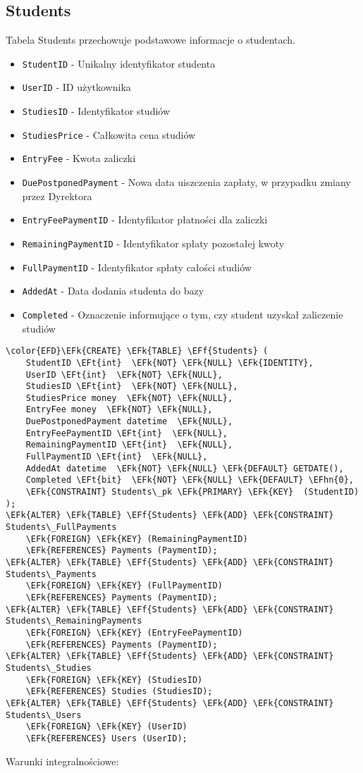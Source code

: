 \documentclass[11pt]{article}
\newcommand{\EFk}[1]{\textcolor{EFk}{\textbf{#1}}} %
\newcommand{\EFf}[1]{\textcolor{EFf}{#1}} %
\newcommand{\EFt}[1]{\textcolor{EFt}{\textbf{#1}}} %
\newcommand{\EFhn}[1]{\textcolor{EFhn}{#1}} %
\begin{document}
\subsection{Students}
\label{sec:org9cfb669}
Tabela Students przechowuje podstawowe informacje o studentach.
\begin{itemize}
\item \texttt{StudentID} - Unikalny identyfikator studenta
\item \texttt{UserID} - ID użytkownika
\item \texttt{StudiesID} - Identyfikator studiów
\item \texttt{StudiesPrice} - Całkowita cena studiów
\item \texttt{EntryFee} - Kwota zaliczki
\item \texttt{DuePostponedPayment} - Nowa data uiszczenia zapłaty, w przypadku zmiany przez Dyrektora
\item \texttt{EntryFeePaymentID} - Identyfikator płatności dla zaliczki
\item \texttt{RemainingPaymentID} - Identyfikator spłaty pozostałej kwoty
\item \texttt{FullPaymentID} - Identyfikator spłaty całości studiów
\item \texttt{AddedAt} - Data dodania studenta do bazy
\item \texttt{Completed} - Oznaczenie informujące o tym, czy student uzyskał zaliczenie studiów
\end{itemize}
\begin{Code}
\begin{Verbatim}
\color{EFD}\EFk{CREATE} \EFk{TABLE} \EFf{Students} (
    StudentID \EFt{int}  \EFk{NOT} \EFk{NULL} \EFk{IDENTITY},
    UserID \EFt{int}  \EFk{NOT} \EFk{NULL},
    StudiesID \EFt{int}  \EFk{NOT} \EFk{NULL},
    StudiesPrice money  \EFk{NOT} \EFk{NULL},
    EntryFee money  \EFk{NOT} \EFk{NULL},
    DuePostponedPayment datetime  \EFk{NULL},
    EntryFeePaymentID \EFt{int}  \EFk{NULL},
    RemainingPaymentID \EFt{int}  \EFk{NULL},
    FullPaymentID \EFt{int}  \EFk{NULL},
    AddedAt datetime  \EFk{NOT} \EFk{NULL} \EFk{DEFAULT} GETDATE(),
    Completed \EFt{bit}  \EFk{NOT} \EFk{NULL} \EFk{DEFAULT} \EFhn{0},
    \EFk{CONSTRAINT} Students\_pk \EFk{PRIMARY} \EFk{KEY}  (StudentID)
);
\EFk{ALTER} \EFk{TABLE} \EFf{Students} \EFk{ADD} \EFk{CONSTRAINT} Students\_FullPayments
    \EFk{FOREIGN} \EFk{KEY} (RemainingPaymentID)
    \EFk{REFERENCES} Payments (PaymentID);
\EFk{ALTER} \EFk{TABLE} \EFf{Students} \EFk{ADD} \EFk{CONSTRAINT} Students\_Payments
    \EFk{FOREIGN} \EFk{KEY} (FullPaymentID)
    \EFk{REFERENCES} Payments (PaymentID);
\EFk{ALTER} \EFk{TABLE} \EFf{Students} \EFk{ADD} \EFk{CONSTRAINT} Students\_RemainingPayments
    \EFk{FOREIGN} \EFk{KEY} (EntryFeePaymentID)
    \EFk{REFERENCES} Payments (PaymentID);
\EFk{ALTER} \EFk{TABLE} \EFf{Students} \EFk{ADD} \EFk{CONSTRAINT} Students\_Studies
    \EFk{FOREIGN} \EFk{KEY} (StudiesID)
    \EFk{REFERENCES} Studies (StudiesID);
\EFk{ALTER} \EFk{TABLE} \EFf{Students} \EFk{ADD} \EFk{CONSTRAINT} Students\_Users
    \EFk{FOREIGN} \EFk{KEY} (UserID)
    \EFk{REFERENCES} Users (UserID);
\end{Verbatim}
\end{Code}
Warunki integralnościowe:
\end{document}
